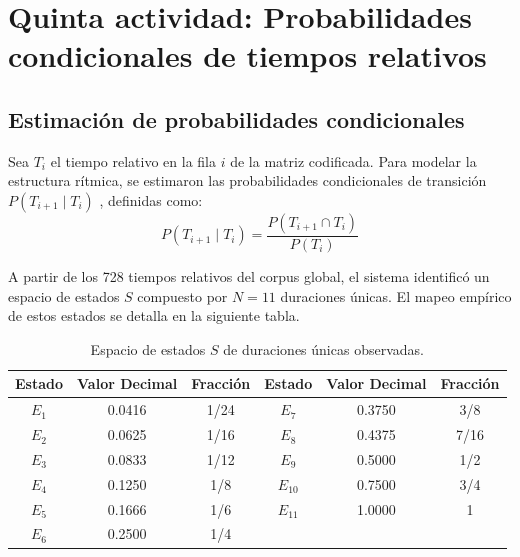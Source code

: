 \documentclass{article}
\theoremstyle{plain}
\theoremstyle{definition}
\begin{document}
\section*{Quinta actividad: Probabilidades condicionales de tiempos relativos}

\subsection*{Estimación de probabilidades condicionales}
Sea $T_i$ el tiempo relativo en la fila $i$ de la matriz codificada. Para modelar la estructura rítmica, se estimaron las probabilidades condicionales de transición $P(T_{i+1} \mid T_i)$ \cite{bertsekas, walpole}, definidas como:
$$P(T_{i+1} \mid T_i) = \frac{P(T_{i+1} \cap T_i)}{P(T_i)}$$

A partir de los 728 tiempos relativos del corpus global, el sistema identificó un espacio de estados $S$ compuesto por $N=11$ duraciones únicas. El mapeo empírico de estos estados se detalla en la siguiente tabla.

\begin{table}[h!]
	\centering
	\begin{tabular}{|c|c|c|c|c|c|}
		\hline
		\textbf{Estado} & \textbf{Valor Decimal} & \textbf{Fracción} & \textbf{Estado}       & \textbf{Valor Decimal} & \textbf{Fracción} \\ \hline
		$E_1$           & 0.0416                 & 1/24              & $E_7$                 & 0.3750                 & 3/8               \\ \hline
		$E_2$           & 0.0625                 & 1/16              & $E_8$                 & 0.4375                 & 7/16              \\ \hline
		$E_3$           & 0.0833                 & 1/12              & $E_9$                 & 0.5000                 & 1/2               \\ \hline
		$E_4$           & 0.1250                 & 1/8               & $E_{10}$              & 0.7500                 & 3/4               \\ \hline
		$E_5$           & 0.1666                 & 1/6               & $E_{11}$              & 1.0000                 & 1                 \\ \hline
		$E_6$           & 0.2500                 & 1/4               & \multicolumn{3}{c|}{}                                              \\ \hline
	\end{tabular}
	\caption{Espacio de estados $S$ de duraciones únicas observadas.}
	\label{tab:estados}
\end{table}
\end{document}
